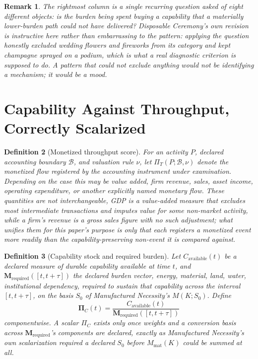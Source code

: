 \documentclass[11pt]{article}
\newtheorem{definition}{Definition}[section]
\newtheorem{remark}[definition]{Remark}
\begin{document}
\begin{remark}
The rightmost column is a single recurring question asked of eight different objects: is the burden being spent buying a capability that a materially lower-burden path could not have delivered? \emph{Disposable Ceremony}'s own revision is instructive here rather than embarrassing to the pattern: applying the question honestly excluded wedding flowers and fireworks from its category and kept champagne sprayed on a podium, which is what a real diagnostic criterion is supposed to do. A pattern that could not exclude anything would not be identifying a mechanism; it would be a mood.
\end{remark}

\section{Capability Against Throughput, Correctly Scalarized}

\begin{definition}[Monetized throughput score]
For an activity $P$, declared accounting boundary $\mathcal{B}$, and valuation rule $\nu$, let $\Pi_T(P; \mathcal{B}, \nu)$ denote the monetized flow registered by the accounting instrument under examination. Depending on the case this may be value added, firm revenue, sales, asset income, operating expenditure, or another explicitly named monetary flow. These quantities are not interchangeable, GDP is a value-added measure that excludes most intermediate transactions and imputes value for some non-market activity, while a firm's revenue is a gross sales figure with no such adjustment; what unifies them for this paper's purpose is only that each registers a monetized event more readily than the capability-preserving non-event it is compared against.
\end{definition}

\begin{definition}[Capability stock and required burden]
Let $C_{\text{available}}(t)$ be a declared measure of durable capability available at time $t$, and $\mathbf{M}_{\text{required}}([t, t+\tau])$ the declared burden vector, energy, material, land, water, institutional dependency, required to sustain that capability across the interval $[t, t+\tau]$, on the basis $S_0$ of \emph{Manufactured Necessity}'s $M(K; S_0)$. Define
\[
\boldsymbol{\Pi}_C(t) = \frac{C_{\text{available}}(t)}{\mathbf{M}_{\text{required}}([t, t+\tau])}
\]
componentwise. A scalar $\Pi_C$ exists only once weights and a conversion basis across $\mathbf{M}_{\text{required}}$'s components are declared, exactly as \emph{Manufactured Necessity}'s own scalarization required a declared $S_0$ before $M_{\text{mat}}(K)$ could be summed at all.
\end{definition}
\end{document}
